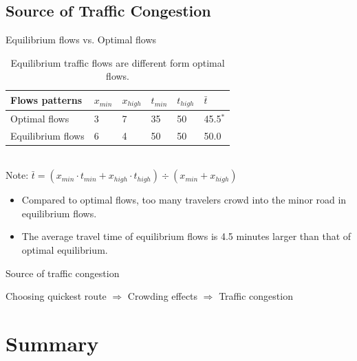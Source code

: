 \documentclass[handout]{beamer}
\begin{document}
\subsection{Source of Traffic Congestion}

\begin{frame}{Equilibrium flows vs. Optimal flows}
\begin{table}
\centering
\caption{Equilibrium traffic flows are different form optimal flows. }
\small
\begin{tabular}{
	l|p{.1\linewidth}|p{.1\linewidth}|p{.1\linewidth}|p{.1\linewidth}|p{.1\linewidth}
}
\hline
Flows patterns & $x_{min}$ & $x_{high}$ & $t_{min}$ & $t_{high}$ & $\bar{t}$\\
\hline
Optimal flows & 3 & 7 & 35 & 50 & 45.5$^*$ \\
Equilibrium flows & 6 & 4 & 50 & 50 & 50.0 \\
\hline
\end{tabular}\\
\vspace{3pt}
{\scriptsize
	Note: $\bar{t} = (x_{min} \cdot t_{min} + x_{high} \cdot t_{high})
	\div (x_{min} + x_{high})$
}
\begin{itemize}
	\item Compared to optimal flows, \alert{too many} travelers crowd into 
		the minor road in equilibrium flows. 
	\item The average travel time of equilibrium flows is 4.5 minutes 
		\alert{larger than} that of optimal equilibrium. 
\end{itemize}
\pause
\begin{block}{Source of traffic congestion}
\begin{center}
Choosing quickest route $\Rightarrow$%
Crowding effects $\Rightarrow$%
Traffic congestion
\end{center}
\end{block}
\end{table}

\end{frame}

\section{Summary}
\end{document}
